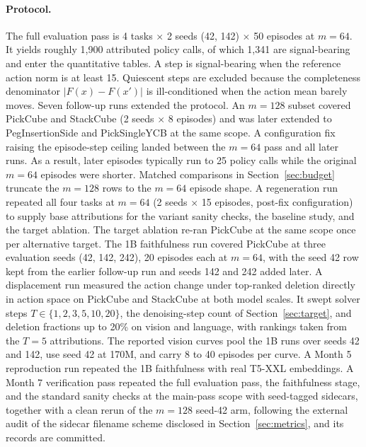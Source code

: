 \documentclass{article}
\begin{document}
\paragraph{Protocol.}
The full evaluation pass is 4 tasks $\times$ 2 seeds (42, 142) $\times$ 50 episodes at $m{=}64$.
It yields roughly 1{,}900 attributed policy calls, of which 1{,}341 are signal-bearing and enter the quantitative tables.
A step is signal-bearing when the reference action norm is at least 15.
Quiescent steps are excluded because the completeness denominator $|F(x) - F(x')|$ is ill-conditioned when the action mean barely moves.
Seven follow-up runs extended the protocol.
An $m{=}128$ subset covered PickCube and StackCube (2 seeds $\times$ 8 episodes) and was later extended to PegInsertionSide and PickSingleYCB at the same scope.
A configuration fix raising the episode-step ceiling landed between the $m{=}64$ pass and all later runs.
As a result, later episodes typically run to 25 policy calls while the original $m{=}64$ episodes were shorter.
Matched comparisons in Section~\ref{sec:budget} truncate the $m{=}128$ rows to the $m{=}64$ episode shape.
A regeneration run repeated all four tasks at $m{=}64$ (2 seeds $\times$ 15 episodes, post-fix configuration) to supply base attributions for the variant sanity checks, the baseline study, and the target ablation.
The target ablation re-ran PickCube at the same scope once per alternative target.
The 1B faithfulness run covered PickCube at three evaluation seeds (42, 142, 242), 20 episodes each at $m{=}64$, with the seed 42 row kept from the earlier follow-up run and seeds 142 and 242 added later.
A displacement run measured the action change under top-ranked deletion directly in action space on PickCube and StackCube at both model scales.
It swept solver steps $T \in \{1, 2, 3, 5, 10, 20\}$, the denoising-step count of Section~\ref{sec:target}, and deletion fractions up to 20\% on vision and language, with rankings taken from the $T{=}5$ attributions.
The reported vision curves pool the 1B runs over seeds 42 and 142, use seed 42 at 170M, and carry 8 to 40 episodes per curve.
A Month 5 reproduction run repeated the 1B faithfulness with real T5-XXL embeddings.
A Month 7 verification pass repeated the full evaluation pass, the faithfulness stage, and the standard sanity checks at the main-pass scope with seed-tagged sidecars, together with a clean rerun of the $m{=}128$ seed-42 arm, following the external audit of the sidecar filename scheme disclosed in Section~\ref{sec:metrics}, and its records are committed.
\end{document}
